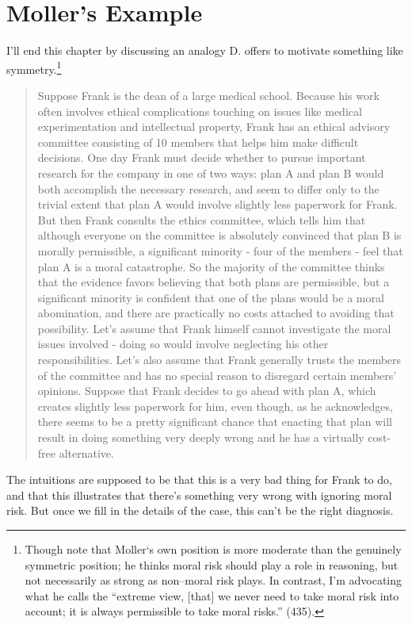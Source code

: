 \section{Moller's Example}
\label{mollersexample}

I'll end this chapter by discussing an analogy D. \citet{Moller2011} offers to motivate something like symmetry.\footnote{Though note that Moller`s own position is more moderate than the genuinely symmetric position; he thinks moral risk should play a role in reasoning, but not necessarily as strong as non--moral risk plays. In contrast, I'm advocating what he calls the ``extreme view, [that] we never need to take moral risk into account; it is always permissible to take moral risks.'' (435).}

\begin{quote}
Suppose \gls{Frank} is the dean of a large medical school. Because his work often involves ethical complications touching on issues like medical experimentation and intellectual property, \gls{Frank} has an ethical advisory committee consisting of 10 members that helps him make difficult decisions. One day \gls{Frank} must decide whether to pursue important research for the company in one of two ways: plan A and plan B would both accomplish the necessary research, and seem to differ only to the trivial extent that plan A would involve slightly less paperwork for \gls{Frank}. But then \gls{Frank} consults the ethics committee, which tells him that although everyone on the committee is absolutely convinced that plan B is morally permissible, a significant minority - four of the members - feel that plan A is a moral catastrophe. So the majority of the committee thinks that the evidence favors believing that both plans are permissible, but a significant minority is confident that one of the plans would be a moral abomination, and there are practically no costs attached to avoiding that possibility. Let's assume that \gls{Frank} himself cannot investigate the moral issues involved - doing so would involve neglecting his other responsibilities. Let's also assume that \gls{Frank} generally trusts the members of the committee and has no special reason to disregard certain members' opinions. Suppose that \gls{Frank} decides to go ahead with plan A, which creates slightly less paperwork for him, even though, as he acknowledges, there seems to be a pretty significant chance that enacting that plan will result in doing something very deeply wrong and he has a virtually cost-free alternative. ~\citep[436]{Moller2011}
\end{quote}
The intuitions are supposed to be that this is a very bad thing for \gls{Frank} to do, and that this illustrates that there's something very wrong with ignoring moral risk. But once we fill in the details of the case, this can't be the right diagnosis.

